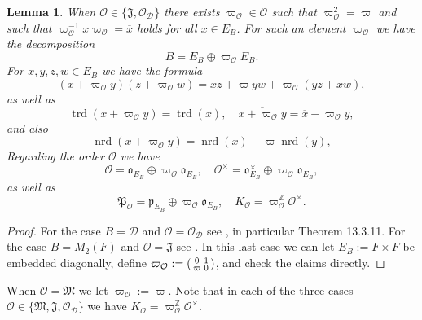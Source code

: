 \documentclass{article}
\newtheorem{lem}{Lemma}[section]
\theoremstyle{named}
\newcommand{\D}{\mathcal{D}}
\newcommand{\Z}{\mathbb{Z}}
\newcommand{\M}{\mathfrak{M}}
\newcommand{\J}{\mathfrak{J}}
\renewcommand{\O}{\mathcal{O}}
\renewcommand{\o}{\mathfrak{o}}
\renewcommand{\P}{\mathfrak{P}}
\newcommand{\p}{\mathfrak{p}}
\DeclareMathOperator{\nrd}{nrd}
\DeclareMathOperator{\trd}{trd}
\begin{document}
\begin{lem}\label{lem:finerstructureramifiedorders}
When $\O \in \{\J, \O_\D\}$ there exists $\varpi_\O \in \O$ such that $\varpi_\O^2 = \varpi$ and such that $\varpi_\O^{-1}x \varpi_\O = \overline{x}$ holds for all $x \in E_B$. For such an element $\varpi_\O$ we have the decomposition
\begin{equation*}
    B = E_B \oplus \varpi_\O E_B.
\end{equation*}
For $x, y, z, w \in E_B$ we have the formula
\begin{equation*}
    (x + \varpi_\O y)(z + \varpi_\O w) = xz + \varpi \overline{y}w + \varpi_\O(yz + \overline{x}w),
\end{equation*}
as well as
\begin{equation}\label{eq:tracecyclicalgebra}
    \trd(x + \varpi_\O y) = \trd(x),\quad 
    \overline{x + \varpi_\O y} = \overline{x} - \varpi_\O y,
\end{equation}
and also
\begin{equation}\label{eq:normcyclicalgebra}
    \nrd(x + \varpi_\O y) = \nrd(x) -\varpi \nrd(y),
\end{equation}
Regarding the order $\O$ we have
\begin{equation}\label{eq:descriptionordercyclicpart1}
    \O = \o_{E_B} \oplus \varpi_\O \o_{E_B}, \quad \O^\times = \o_{E_B}^\times \oplus \varpi_\O \o_{E_B},
\end{equation}
as well as 
\begin{equation}\label{eq:descriptionordercyclicpart2}
    \P_\O = \p_{E_B} \oplus \varpi_\O \o_{E_B}, \quad K_\O = \varpi_\O^{\Z} \O^\times.
\end{equation}
\end{lem}
\begin{proof}
For the case $B = \D$ and $\O = \O_\D$ see \cite[Chapter 13]{voight}, in particular Theorem 13.3.11. For the case $B = M_2(F)$ and $\O = \J$ see \cite[Section 23.3]{voight}.  In this last case we can let $E_B := F \times F$ be embedded diagonally, define $\varpi_\O := \begin{psmallmatrix}
    0 & 1\\
    \varpi & 0
\end{psmallmatrix}$, and check the claims directly.  
\end{proof}

When $\O = \M$ we let $\varpi_\O := \varpi$. Note that in each of the three cases $\O \in \{\M, \J, \O_\D\}$ we have $K_\O = \varpi_\O^\Z \O^\times$.
\end{document}
